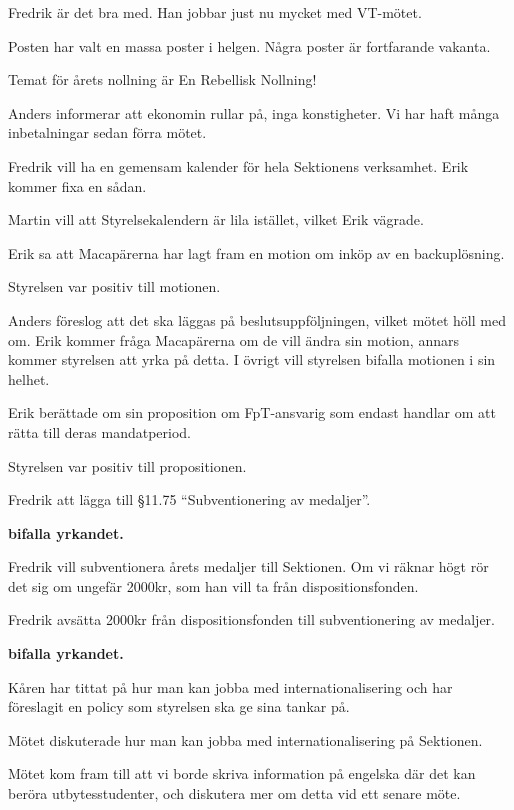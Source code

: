 \documentclass[10pt]{article}
\begin{document}
\begin{paragrafer}
\begin{paragrafer}
Fredrik är det bra med. Han jobbar just nu mycket med VT-mötet.

Posten har valt en massa poster i helgen. Några poster är fortfarande vakanta.

Temat för årets nollning är En Rebellisk Nollning!

Anders informerar att ekonomin rullar på, inga konstigheter. Vi har haft många inbetalningar sedan förra mötet.

\end{paragrafer}

Fredrik vill ha en gemensam kalender för hela Sektionens verksamhet. Erik kommer fixa en sådan.

Martin vill att Styrelsekalendern är lila istället, vilket Erik vägrade.

Erik sa att Macapärerna har lagt fram en motion om inköp av en backuplösning.

Styrelsen var positiv till motionen.

Anders föreslog att det ska läggas på beslutsuppföljningen, vilket mötet höll med om. Erik kommer fråga Macapärerna om de vill ändra sin motion, annars kommer styrelsen att yrka på detta. I övrigt vill styrelsen bifalla motionen i sin helhet.

Erik berättade om sin proposition om FpT-ansvarig som endast handlar om att rätta till deras mandatperiod.

Styrelsen var positiv till propositionen.

Fredrik \ypa att lägga till \S11.75 ``Subventionering av medaljer''.

\textbf{\Mba bifalla yrkandet.}

Fredrik vill subventionera årets medaljer till Sektionen. Om vi räknar högt rör det sig om ungefär 2000kr, som han vill ta från dispositionsfonden.

Fredrik \ypa avsätta 2000kr från dispositionsfonden till subventionering av medaljer.

\textbf{\Mba bifalla yrkandet.}

Kåren har tittat på hur man kan jobba med internationalisering och har föreslagit en policy som styrelsen ska ge sina tankar på.

Mötet diskuterade hur man kan jobba med internationalisering på Sektionen.

Mötet kom fram till att vi borde skriva information på engelska där det kan beröra utbytesstudenter, och diskutera mer om detta vid ett senare möte.


\end{paragrafer}
\end{document}
